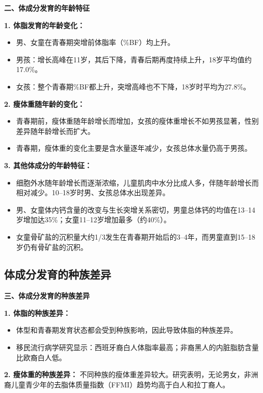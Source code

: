 \begin{keybox}
\textbf{二、体成分发育的年龄特征}

\textbf{1. 体脂发育的年龄变化：}
\begin{itemize}[leftmargin=*]
    \item 男、女童在青春期突增前体脂率（\%BF）均上升。
    \item 男孩：增长高峰在11岁，其后下降，青春后期再度持续上升，18岁平均值约17.0\%。
    \item 女孩：整个青春期\%BF都上升，突增高峰也不下降，18岁时平均为27.8\%。
\end{itemize}

\textbf{2. 瘦体重随年龄的变化：}
\begin{itemize}[leftmargin=*]
    \item 青春期前，瘦体重随年龄增长而增加，女孩的瘦体重增长不如男孩显著，性别差异随年龄增长而扩大。
    \item 青春期，瘦体重的变化主要是含水量逐年减少，女孩总体水量仍高于男孩。
\end{itemize}

\textbf{3. 其他体成分的年龄特征：}
\begin{itemize}[leftmargin=*]
    \item 细胞外水随年龄增长而逐渐浓缩，儿童肌肉中水分比成人多，伴随年龄增长而相对减少。10--18岁时男、女孩总体水出现差异。
    \item 男、女童体内钙含量的改变与生长突增关系密切，男童总体钙的均值在13--14岁增加达35\%；女童11--12岁增加最多（约40\%）。
    \item 女童骨矿盐的沉积量大约1/3发生在青春期开始后的3--4年，而男童直到15--18岁仍有骨矿盐的沉积。
\end{itemize}
\end{keybox}

\subsection{体成分发育的种族差异}

\begin{defbox}
\textbf{三、体成分发育的种族差异}

\textbf{1. 体脂的种族差异：}
\begin{itemize}[leftmargin=*]
    \item 体型和青春期发育状态都会受到种族影响，因此导致体脂的种族差异。
    \item 移民流行病学研究显示：西班牙裔白人体脂率最高；非裔黑人的内脏脂肪含量比欧裔白人低。
\end{itemize}

\textbf{2. 瘦体重的种族差异：}
不同种族的瘦体重差异较大。研究表明，无论男女，非洲裔儿童青少年的去脂体质量指数（FFMI）趋势均高于白人和拉丁裔人。
\end{defbox}


